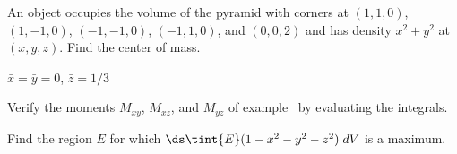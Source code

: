 \begin{exercises}
\exercise An object occupies the volume of the pyramid with corners at 
$(1,1,0)$, $(1,-1,0)$, $(-1,-1,0)$, $(-1,1,0)$, and $(0,0,2)$ and has
density $x^2+y^2$ at $(x,y,z)$. Find the center of mass.
\begin{answer} $\bar x=\bar y=0$, $\bar z=1/3$
\end{answer}

\exercise Verify the moments $M_{xy}$, $M_{xz}$, and $M_{yz}$
of example~ by evaluating the
integrals. 


\exercise Find the region $E$ for which $\ds\tint{E}
  (1-x^2-y^2-z^2) \; dV$ is a maximum.


\end{exercises}

